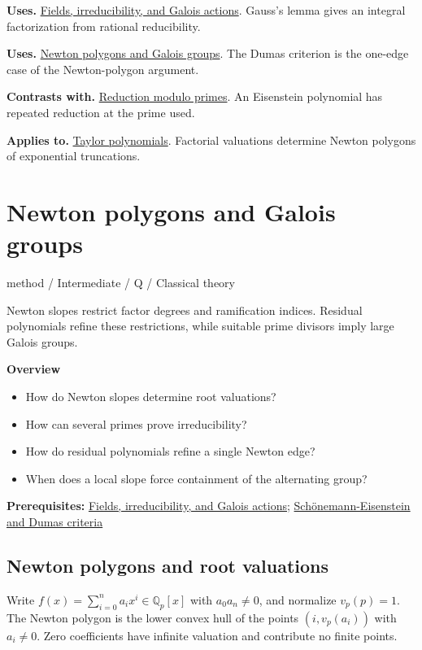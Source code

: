 \documentclass[11pt,a4paper,oneside,openany]{book}
\begin{document}
\color{black}\textbf{Uses.} \hyperlink{article:foundations}{Fields, irreducibility, and Galois actions}. Gauss's lemma gives an integral factorization from rational reducibility.\par
\color{black}\textbf{Uses.} \hyperlink{article:newton-polygons}{Newton polygons and Galois groups}. The Dumas criterion is the one-edge case of the Newton-polygon argument.\par
\color{black}\textbf{Contrasts with.} \hyperlink{article:modular-irreducibility}{Reduction modulo primes}. An Eisenstein polynomial has repeated reduction at the prime used.\par
\color{black}\textbf{Applies to.} \hyperlink{article:taylor}{Taylor polynomials}. Factorial valuations determine Newton polygons of exponential truncations.\par
\endgroup
\chapter{Newton polygons and Galois groups}\label{article:newton-polygons}\hypertarget{article:newton-polygons}{}\color{black}
{\sffamily\small\color{atlasgold}method / Intermediate / Q / Classical theory}\par\medskip
Newton slopes restrict factor degrees and ramification indices. Residual polynomials refine these restrictions, while suitable prime divisors imply large Galois groups.\par\medskip
\textbf{Overview}\begin{itemize}
\item How do Newton slopes determine root valuations?
\item How can several primes prove irreducibility?
\item How do residual polynomials refine a single Newton edge?
\item When does a local slope force containment of the alternating group?
\end{itemize}
{\small\textbf{Prerequisites:} \hyperlink{article:foundations}{Fields, irreducibility, and Galois actions}; \hyperlink{article:eisenstein-dumas}{Schönemann-Eisenstein and Dumas criteria}}\par
{}\section{Newton polygons and root valuations}
\color{black} Write \(f(x)=\sum_{i=0}^n a_ix^i\in\mathbb Q_p[x]\) with \(a_0a_n\ne0\), and normalize \(v_p(p)=1\). The Newton polygon is the lower convex hull of the points \((i,v_p(a_i))\) with \(a_i\ne0\). Zero coefficients have infinite valuation and contribute no finite points.\par
\end{document}
